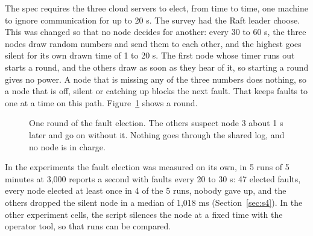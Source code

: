 The spec requires the three cloud servers to elect, from time to time, one machine to ignore communication for up to 20 s. The survey had the Raft leader choose. This was changed so that no node decides for another: every 30 to 60 s, the three nodes draw random numbers and send them to each other, and the highest goes silent for its own drawn time of 1 to 20 s. The first node whose timer runs out starts a round, and the others draw as soon as they hear of it, so starting a round gives no power. A node that is missing any of the three numbers does nothing, so a node that is off, silent or catching up blocks the next fault. That keeps faults to one at a time on this path. Figure~\ref{fig:seq-faultel} shows a round.

\begin{figure}[!htb]
\centering
{}
\caption{One round of the fault election. The others suspect node 3 about 1 s later and go on without it. Nothing goes through the shared log, and no node is in charge.}
\label{fig:seq-faultel}
\end{figure}

In the experiments the fault election was measured on its own, in 5 runs of 5 minutes at 3,000 reports a second with faults every 20 to 30 s: 47 elected faults, every node elected at least once in 4 of the 5 runs, nobody gave up, and the others dropped the silent node in a median of 1,018 ms (Section~\ref{sec:s4}). In the other experiment cells, the script silences the node at a fixed time with the operator tool, so that runs can be compared.
